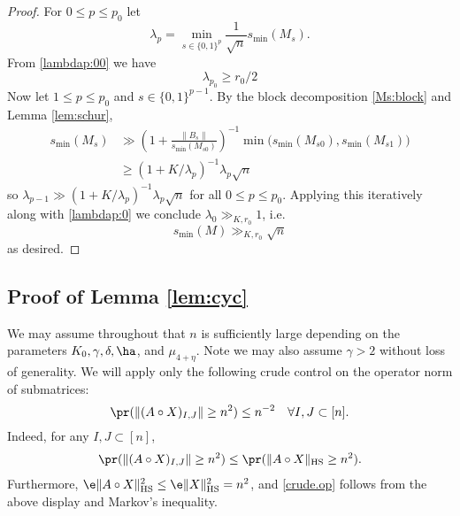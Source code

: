\documentclass[aop,preprint]{imsart}
\theoremstyle{plain}
\theoremstyle{definition}
\theoremstyle{remark}
\numberwithin{equation}{section}
\numberwithin{theorem}{section}
\def \HS {\mathrm{HS}}
\begin{document}
\begin{proof}
For $0\le p\le p_0$ let
\begin{equation}
\lambda_p= \min_{s\in \{0,1\}^p} \frac{1}{\sqrt{n}} s_{\min}(M_s).
\end{equation}
From \eqref{lambdap:00} we have
\begin{equation}	 \label{lambdap:0}
\lambda_{p_0}\ge r_0/2
\end{equation}
Now let $1\le p\le p_0$ and $s\in \{0,1\}^{p-1}$. By the block decomposition \eqref{Ms:block} and Lemma \ref{lem:schur},
\begin{align*}
s_{\min}(M_s) 
&\gg \left(1+ \frac{\|B_s\|}{s_{\min}(M_{s0})}\right)^{-1} \min\big( s_{\min}(M_{s0}), s_{\min}(M_{s1})\big)\\
&\ge (1+K/\lambda_p)^{-1}\lambda_p\sqrt{n}
\end{align*}
so $\lambda_{p-1} \gg (1+K/\lambda_p)^{-1}\lambda_p\sqrt{n}$ for all $0\le p\le p_0$. 
Applying this iteratively along with \eqref{lambdap:0} we conclude $\lambda_0\gg_{K,r_0} 1$, i.e. 
\begin{equation}
s_{\min}(M) \gg_{K,r_0} \sqrt{n}
\end{equation}
as desired.
\end{proof}


\subsection{Proof of Lemma \ref{lem:cyc}}		\label{sec:cyc}
We may assume throughout that $n$ is sufficiently large depending on the parameters $K_0,\gamma,\delta,\ha$, and $\mu_{4+\eta}$. Note we may also assume $\gamma> 2$ without loss of generality.
We will apply only the following crude control on the operator norm of submatrices: 
\begin{equation}	\label{crude.op}
\pr(\|(A\circ X)_{I,J}\|\ge n^2 ) \le n^{-2}	\quad \forall I,J\subset[n].
\end{equation}
Indeed, for any $I,J\subset[n]$,
\begin{align*}
\pr(\|(A\circ X)_{I,J}\|\ge n^2 ) \le  \pr(\|A\circ X\|_{\HS}\ge n^2) .
\end{align*}
Furthermore, $\e\|A\circ X\|_{\HS}^2 \le \e \|X\|_{\HS}^2 = n^2$, %
and \eqref{crude.op} follows from the above display and Markov's inequality.
%
\end{document}
